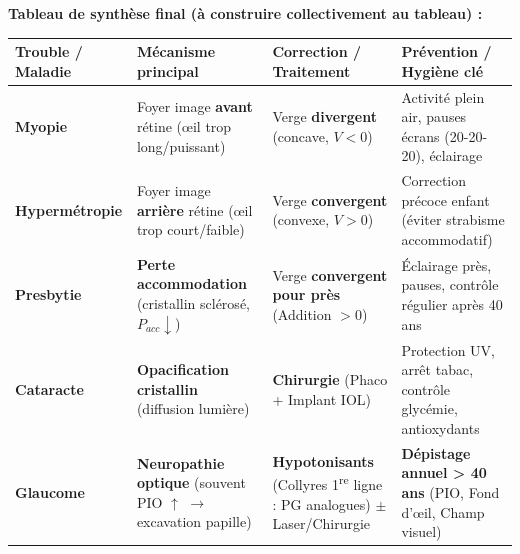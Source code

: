 \documentclass[11pt]{article}
\begin{document}
\noindent\textbf{Tableau de synthèse final (à construire collectivement au tableau) :}

\begin{center}
\begin{tabularx}{\linewidth}{|l|X|X|X|}\hline
\rowcolor{popblueL} \textbf{Trouble / Maladie} & \textbf{Mécanisme principal} & \textbf{Correction / Traitement} & \textbf{Prévention / Hygiène clé} \\\hline
\textbf{Myopie} & Foyer image \textbf{avant} rétine (œil trop long/puissant) & Verge \textbf{divergent} (concave, $V < 0$) & Activité plein air, pauses écrans (20-20-20), éclairage \\\hline
\textbf{Hypermétropie} & Foyer image \textbf{arrière} rétine (œil trop court/faible) & Verge \textbf{convergent} (convexe, $V > 0$) & Correction précoce enfant (éviter strabisme accommodatif) \\\hline
\textbf{Presbytie} & \textbf{Perte accommodation} (cristallin sclérosé, $P_{acc} \downarrow$) & Verge \textbf{convergent pour près} (Addition $> 0$) & Éclairage près, pauses, contrôle régulier après 40 ans \\\hline
\textbf{Cataracte} & \textbf{Opacification cristallin} (diffusion lumière) & \textbf{Chirurgie} (Phaco + Implant IOL) & Protection UV, arrêt tabac, contrôle glycémie, antioxydants \\\hline
\textbf{Glaucome} & \textbf{Neuropathie optique} (souvent PIO $\uparrow$ $\rightarrow$ excavation papille) & \textbf{Hypotonisants} (Collyres 1\textsuperscript{re} ligne : PG analogues) $\pm$ Laser/Chirurgie & \textbf{Dépistage annuel > 40 ans} (PIO, Fond d'œil, Champ visuel) \\\hline
\end{tabularx}
\end{center}
\end{document}
